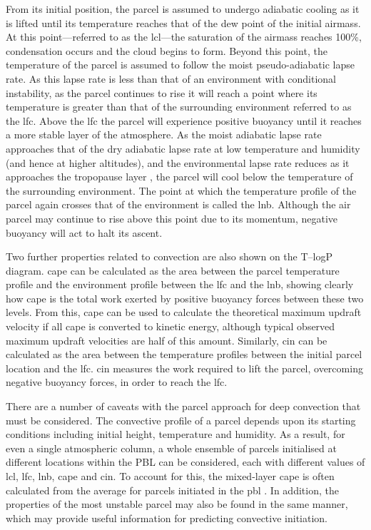 From its initial position, the parcel is assumed to undergo adiabatic cooling as it is lifted until its temperature reaches that of the dew point of the initial airmass. 
At this point---referred to as the \acrshort{lcl}---the saturation of the airmass reaches 100\%, condensation occurs and the cloud begins to form. 
Beyond this point, the temperature of the parcel is assumed to follow the moist pseudo-adiabatic lapse rate. 
As this lapse rate is less than that of an environment with conditional instability, as the parcel continues to rise it will reach a point where its temperature is greater than that of the surrounding environment referred to as the \acrshort{lfc}. 
Above the \acrshort{lfc} the parcel will experience positive buoyancy until it reaches a more stable layer of the atmosphere. 
As the moist adiabatic lapse rate approaches that of the dry adiabatic lapse rate at low temperature and humidity (and hence at higher altitudes), and the environmental lapse rate reduces as it approaches the tropopause layer \citep{fueglistaler_tropical_2009}, the parcel will cool below the temperature of the surrounding environment. 
The point at which the temperature profile of the parcel again crosses that of the environment is called the \acrfull{lnb}. 
Although the air parcel may continue to rise above this point due to its momentum, negative buoyancy will act to halt its ascent.

Two further properties related to convection are also shown on the T--logP diagram. 
\acrshort{cape} can be calculated as the area between the parcel temperature profile and the environment profile between the \acrshort{lfc} and the \acrshort{lnb}, showing clearly how \acrshort{cape} is the total work exerted by positive buoyancy forces between these two levels. 
From this, \acrshort{cape} can be used to calculate the theoretical maximum updraft velocity if all \acrshort{cape} is converted to kinetic energy, although typical observed maximum updraft velocities are half of this amount. 
Similarly, \acrfull{cin} can be calculated as the area between the temperature profiles between the initial parcel location and the \acrshort{lfc}. 
\acrshort{cin} measures the work required to lift the parcel, overcoming negative buoyancy forces, in order to reach the \acrshort{lfc}.

There are a number of caveats with the parcel approach for deep convection that must be considered. 
The convective profile of a parcel depends upon its starting conditions including initial height, temperature and humidity. 
As a result, for even a single atmospheric column, a whole ensemble of parcels initialised at different locations within the PBL can be considered, each with different values of \acrshort{lcl}, \acrshort{lfc}, \acrshort{lnb}, \acrshort{cape} and \acrshort{cin}. 
To account for this, the mixed-layer \acrshort{cape} is often calculated from the average for parcels initiated in the \acrshort{pbl} \citep{stull_practical_2016}. 
In addition, the properties of the most unstable parcel may also be found in the same manner, which may provide useful information for predicting convective initiation.

